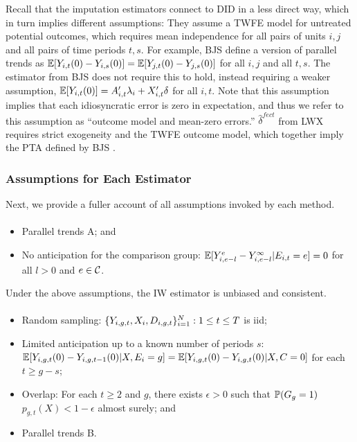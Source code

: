 \documentclass[12pt]{article}
\begin{document}
Recall that the imputation estimators connect to DID in a less direct way, which in turn implies different assumptions: They assume a TWFE model for untreated potential outcomes, which requires mean independence for all pairs of units $i,j$ and all pairs of time periods $t,s$. For example, BJS \citeyearpar{BJS2021} define a version of parallel trends as $\E[Y_{i,t}(0) - Y_{i,s}(0)]=\E[Y_{j,t}(0) - Y_{j,s}(0)]$ for all $i,j$ and all $t,s$. The estimator from BJS \citeyearpar{BJS2021} does not require this to hold, instead requiring a weaker assumption, $\E[\Yit(0)] = \Ait'\lambda_i+\Xit'\delta$ for all $i,t$. Note that this assumption implies that each idiosyncratic error is zero in expectation, and thus we refer to this assumption as ``outcome model and mean-zero errors.'' $\hat\delta^{fect}$ from LWX \citeyearpar{LWX2022} requires strict exogeneity and the TWFE outcome model, which together imply the PTA defined by BJS \citeyearpar{BJS2021}. 



\subsubsection{Assumptions for Each Estimator}
Next, we provide a fuller account of all assumptions invoked by each method.

\paragraph*{\citet{sun2021-event}}
\begin{itemize}
    \item Parallel trends A; and
    \item No anticipation for the comparison group: $\E[Y_{i, e-l}^e - Y^\infty_{i,e-l} | \eventtime=e]=0$ for all $l > 0$ and $e\in\mc{C}$.
\end{itemize} 

Under the above assumptions, the IW estimator is unbiased and consistent.


\paragraph*{\citet{callaway2021-did}}

\begin{itemize}
    \item Random sampling: $\{\Yigt, X_i, \Digt\}_{i=1}^N : 1 \leq t \leq T$ is iid;
    \item Limited anticipation up to a known number of periods $s$: $\E[Y_{i,g,t}(0) - Y_{i,g,t-1}(0)|X, E_i=g]=\E[Y_{i,g,t}(0)-Y_{i,g,t}(0) | X, C=0]$ for each $t \geq g-s$;
    \item Overlap: For each $t\geq2$ and $g$, there exists $\epsilon > 0$ such that $\P(G_g=1)$ $p_{g,t}(X) < 1 - \epsilon$ almost surely; and
    \item Parallel trends B.
\end{itemize}
\end{document}
